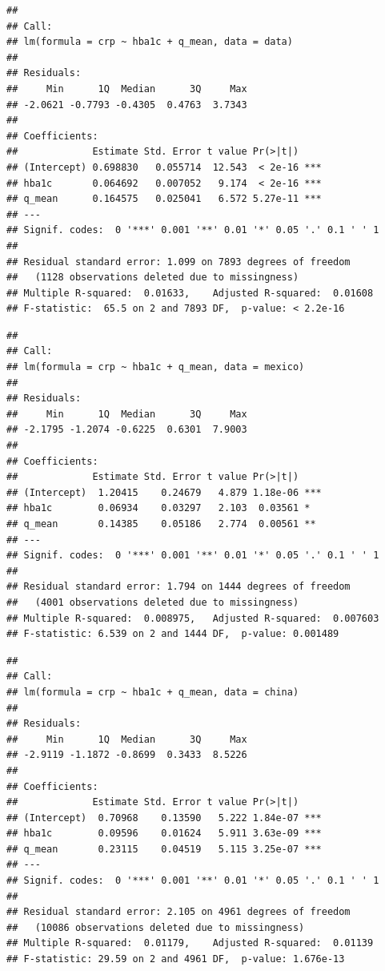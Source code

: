\documentclass[
  man,floatsintext]{apa6}
\begin{document}
\begin{verbatim}
## 
## Call:
## lm(formula = crp ~ hba1c + q_mean, data = data)
## 
## Residuals:
##     Min      1Q  Median      3Q     Max 
## -2.0621 -0.7793 -0.4305  0.4763  3.7343 
## 
## Coefficients:
##             Estimate Std. Error t value Pr(>|t|)    
## (Intercept) 0.698830   0.055714  12.543  < 2e-16 ***
## hba1c       0.064692   0.007052   9.174  < 2e-16 ***
## q_mean      0.164575   0.025041   6.572 5.27e-11 ***
## ---
## Signif. codes:  0 '***' 0.001 '**' 0.01 '*' 0.05 '.' 0.1 ' ' 1
## 
## Residual standard error: 1.099 on 7893 degrees of freedom
##   (1128 observations deleted due to missingness)
## Multiple R-squared:  0.01633,    Adjusted R-squared:  0.01608 
## F-statistic:  65.5 on 2 and 7893 DF,  p-value: < 2.2e-16
\end{verbatim}

\begin{verbatim}
## 
## Call:
## lm(formula = crp ~ hba1c + q_mean, data = mexico)
## 
## Residuals:
##     Min      1Q  Median      3Q     Max 
## -2.1795 -1.2074 -0.6225  0.6301  7.9003 
## 
## Coefficients:
##             Estimate Std. Error t value Pr(>|t|)    
## (Intercept)  1.20415    0.24679   4.879 1.18e-06 ***
## hba1c        0.06934    0.03297   2.103  0.03561 *  
## q_mean       0.14385    0.05186   2.774  0.00561 ** 
## ---
## Signif. codes:  0 '***' 0.001 '**' 0.01 '*' 0.05 '.' 0.1 ' ' 1
## 
## Residual standard error: 1.794 on 1444 degrees of freedom
##   (4001 observations deleted due to missingness)
## Multiple R-squared:  0.008975,   Adjusted R-squared:  0.007603 
## F-statistic: 6.539 on 2 and 1444 DF,  p-value: 0.001489
\end{verbatim}

\begin{verbatim}
## 
## Call:
## lm(formula = crp ~ hba1c + q_mean, data = china)
## 
## Residuals:
##     Min      1Q  Median      3Q     Max 
## -2.9119 -1.1872 -0.8699  0.3433  8.5226 
## 
## Coefficients:
##             Estimate Std. Error t value Pr(>|t|)    
## (Intercept)  0.70968    0.13590   5.222 1.84e-07 ***
## hba1c        0.09596    0.01624   5.911 3.63e-09 ***
## q_mean       0.23115    0.04519   5.115 3.25e-07 ***
## ---
## Signif. codes:  0 '***' 0.001 '**' 0.01 '*' 0.05 '.' 0.1 ' ' 1
## 
## Residual standard error: 2.105 on 4961 degrees of freedom
##   (10086 observations deleted due to missingness)
## Multiple R-squared:  0.01179,    Adjusted R-squared:  0.01139 
## F-statistic: 29.59 on 2 and 4961 DF,  p-value: 1.676e-13
\end{verbatim}
\end{document}
